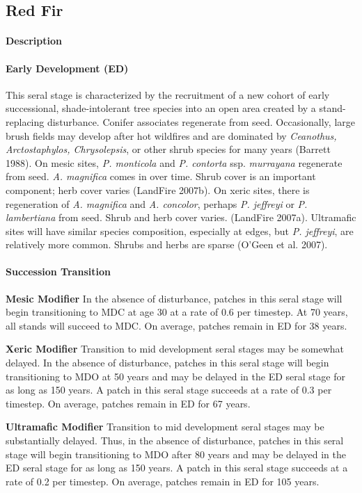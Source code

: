 \subsection*{Red Fir}

\paragraph{Description}
\paragraph{Early Development (ED)} This seral stage is characterized by the recruitment of a new cohort of early successional, shade-intolerant tree species into an open area created by a stand-replacing disturbance. Conifer associates regenerate from seed. Occasionally, large brush fields may develop after hot wildfires and are dominated by \emph{Ceanothus, Arctostaphylos, Chrysolepsis}, or other shrub species for many years (Barrett 1988). On mesic sites, \emph{P. monticola} and \emph{P. contorta} ssp. \emph{murrayana} regenerate from seed. \emph{A. magnifica} comes in over time. Shrub cover is an important component; herb cover varies (LandFire 2007b). On xeric sites, there is regeneration of \emph{A. magnifica} and \emph{A. concolor}, perhaps \emph{P. jeffreyi} or \emph{P. lambertiana} from seed. Shrub and herb cover varies. (LandFire 2007a). Ultramafic sites will have similar species composition, especially at edges, but \emph{P. jeffreyi}, are relatively more common. Shrubs and herbs are sparse (O'Geen et al. 2007).

\paragraph{Succession Transition}

\begin{adjustwidth}{2cm}{}

\noindent \textbf{Mesic Modifier } In the absence of disturbance, patches in this seral stage will begin transitioning to MDC at age 30 at a rate of 0.6 per timestep. At 70 years, all stands will succeed to MDC. On average, patches remain in ED for 38 years.

\medskip
\noindent \textbf{Xeric Modifier}  Transition to mid development seral stages may be somewhat delayed. In the absence of disturbance, patches in this seral stage will begin transitioning to MDO at 50 years and may be delayed in the ED seral stage for as long as 150 years. A patch in this seral stage succeeds at a rate of 0.3 per timestep. On average, patches remain in ED for 67 years.

\medskip
\noindent \textbf{Ultramafic Modifier}  Transition to mid development seral stages may be substantially delayed. Thus, in the absence of disturbance, patches in this seral stage will begin transitioning to MDO after 80 years and may be delayed in the ED seral stage for as long as 150 years. A patch in this seral stage succeeds at a rate of 0.2 per timestep. On average, patches remain in ED for 105 years.

\end{adjustwidth}



